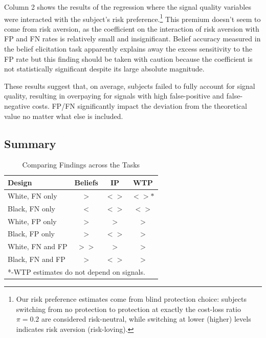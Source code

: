 \documentclass[12pt,a4paper]{article}
\begin{document}
Column 2 shows the results of the regression where the signal quality variables were interacted with the subject’s risk preference.\footnote{Our risk preference estimates come from blind protection choice: subjects switching from no protection to protection at exactly the cost-loss ratio $\pi=0.2$ are considered risk-neutral, while switching at lower (higher) levels indicates risk aversion (risk-loving).} This premium doesn’t seem to come from risk aversion, as the coefficient on the interaction of risk aversion with FP and FN rates is relatively small and insignificant. Belief accuracy measured in the belief elicitation task apparently explains away the excess sensitivity to the FP rate but this finding should be taken with caution because the coefficient is not statistically significant despite its large absolute magnitude.

These results suggest that, on average, subjects failed to fully account for signal quality, resulting in overpaying for signals with high false-positive and false-negative costs.  FP/FN significantly impact the deviation from the theoretical value no matter what else is included.  



\subsection{Summary}

\begin{table}[H]\centering
\caption{Comparing Findings across the Tasks}
\begin{tabular}{l|c|c|c}
\hline \hline
Design & Beliefs & IP &WTP\\
\hline
White, FN only & $>$ & $<>$ & $<>*$ \\
Black, FN only & $<$ & $<>$ & $<>$ \\
White, FP only & $>$ & $>$ & $>$ \\
Black, FP only & $>$ & $<>$ & $>$ \\
White, FN and FP & $>>$ & $>$ & $>$ \\
Black, FN and FP & $>$ & $<>$ & $>$\\
\hline
\multicolumn{4}{l}{*-WTP estimates do not depend on signals.}\\
\end{tabular}
\end{table}
\end{document}
